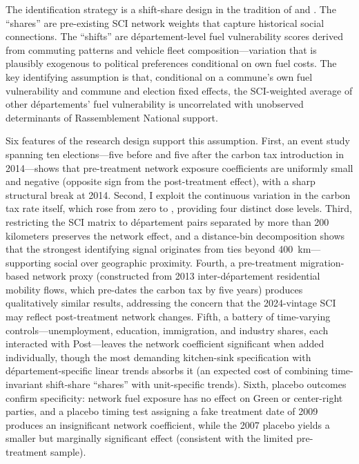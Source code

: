 \documentclass[12pt]{article}
\providecommand{\euro}{\texteuro}
\newcommand{\rn}{Rassemblement National}
\newcommand{\dept}{d\'{e}partement}
\newcommand{\depts}{d\'{e}partements}
\begin{document}
The identification strategy is a shift-share design in the tradition of \citet{goldsmith2020bartik} and \citet{borusyak2022quasi}. The ``shares'' are pre-existing SCI network weights that capture historical social connections. The ``shifts'' are \dept{}-level fuel vulnerability scores derived from commuting patterns and vehicle fleet composition---variation that is plausibly exogenous to political preferences conditional on own fuel costs. The key identifying assumption is that, conditional on a commune's own fuel vulnerability and commune and election fixed effects, the SCI-weighted average of other \depts{}' fuel vulnerability is uncorrelated with unobserved determinants of \rn{} support.

Six features of the research design support this assumption. First, an event study spanning ten elections---five before and five after the carbon tax introduction in 2014---shows that pre-treatment network exposure coefficients are uniformly small and negative (opposite sign from the post-treatment effect), with a sharp structural break at 2014. Second, I exploit the continuous variation in the carbon tax rate itself, which rose from zero to \euro 44.60, providing four distinct dose levels. Third, restricting the SCI matrix to \dept{} pairs separated by more than 200 kilometers preserves the network effect, and a distance-bin decomposition shows that the strongest identifying signal originates from ties beyond 400~km---supporting social over geographic proximity. Fourth, a pre-treatment migration-based network proxy (constructed from 2013 inter-\dept{} residential mobility flows, which pre-dates the carbon tax by five years) produces qualitatively similar results, addressing the concern that the 2024-vintage SCI may reflect post-treatment network changes. Fifth, a battery of time-varying controls---unemployment, education, immigration, and industry shares, each interacted with Post---leaves the network coefficient significant when added individually, though the most demanding kitchen-sink specification with \dept{}-specific linear trends absorbs it (an expected cost of combining time-invariant shift-share ``shares'' with unit-specific trends). Sixth, placebo outcomes confirm specificity: network fuel exposure has no effect on Green or center-right parties, and a placebo timing test assigning a fake treatment date of 2009 produces an insignificant network coefficient, while the 2007 placebo yields a smaller but marginally significant effect (consistent with the limited pre-treatment sample).
\end{document}
